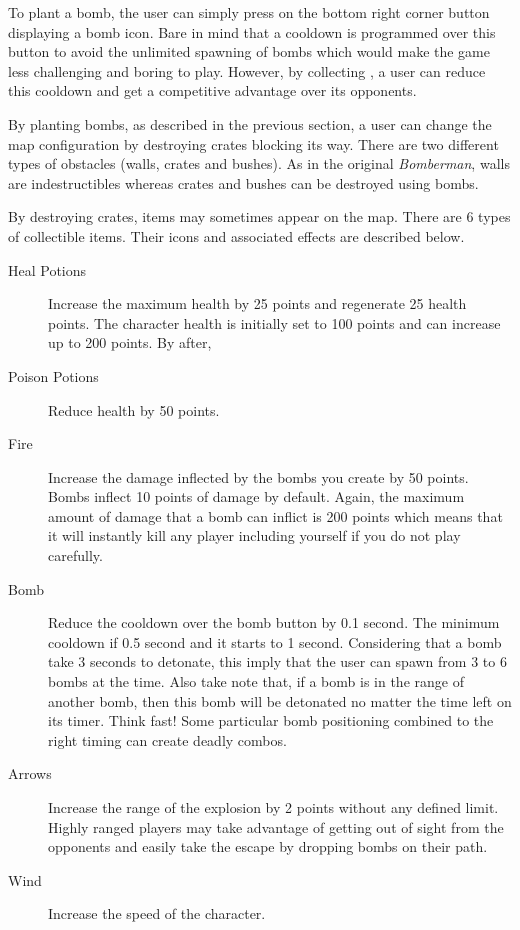 To plant a bomb, the user can simply press on the bottom right corner button displaying a bomb icon. Bare in mind that a cooldown is programmed over this button to avoid the unlimited spawning of bombs which would make the game less challenging and boring to play. However, by collecting , a user can reduce this cooldown and get a competitive advantage over its opponents.

By planting bombs, as described in the previous section, a user can change the map configuration by destroying crates blocking its way. There are two different types of obstacles (walls, crates and bushes). As in the original \textit{Bomberman}, walls are indestructibles whereas crates and bushes can be destroyed using bombs.

By destroying crates, items may sometimes appear on the map. There are 6 types of collectible items. Their icons and associated effects are described below.
\begin{description}
\item [Heal Potions] Increase the maximum health by 25 points and regenerate 25 health points. The character health is initially set to 100 points and can increase up to 200 points. By after,
\item [Poison Potions] Reduce health by 50 points.
\item [Fire] Increase the damage inflected by the bombs you create by 50 points. Bombs inflect 10 points of damage by default. Again, the maximum amount of damage that a bomb can inflict is 200 points which means that it will instantly kill any player including yourself if you do not play carefully.
\item [Bomb] Reduce the cooldown over the bomb button by 0.1 second. The minimum cooldown if 0.5 second and it starts to 1 second. Considering that a bomb take 3 seconds to detonate, this imply that the user can spawn from 3 to 6 bombs at the time. Also take note that, if a bomb is in the range of another bomb, then this bomb will be detonated no matter the time left on its timer. Think fast! Some particular bomb positioning combined to the right timing can create deadly combos.
\item [Arrows] Increase the range of the explosion by 2 points without any defined limit. Highly ranged players may take advantage of getting out of sight from the opponents and easily take the escape by dropping bombs on their path.
\item [Wind] Increase the speed of the character.
\end{description}
